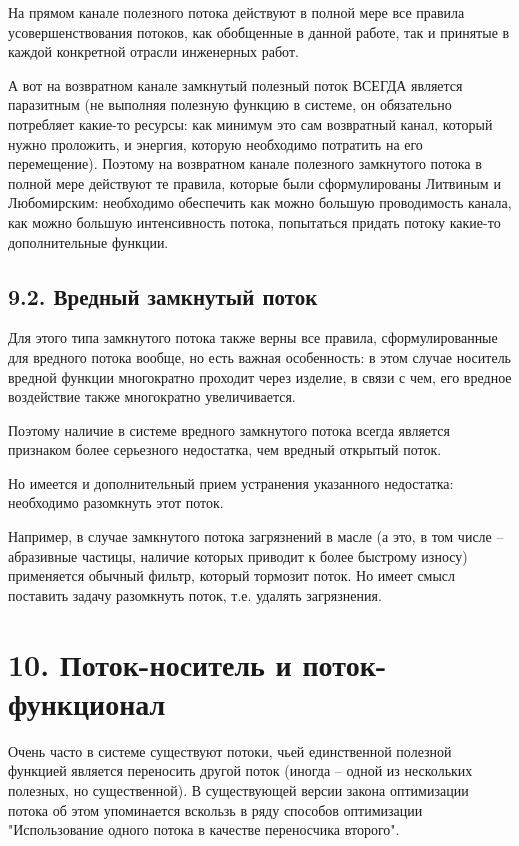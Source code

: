 \documentclass[a4paper,11pt]{article}
\begin{document}
На прямом канале полезного потока действуют в полной мере все правила
усовершенствования потоков, как обобщенные в данной работе, так и принятые в
каждой конкретной отрасли инженерных работ.

А вот на возвратном канале замкнутый полезный поток ВСЕГДА является паразитным
(не выполняя полезную функцию в системе, он обязательно потребляет какие-то
ресурсы: как минимум это сам возвратный канал, который нужно проложить, и
энергия, которую необходимо потратить на его перемещение). Поэтому на
возвратном канале полезного замкнутого потока в полной мере действуют те
правила, которые были сформулированы Литвиным и Любомирским: необходимо
обеспечить как можно большую проводимость канала, как можно большую
интенсивность потока, попытаться придать потоку какие-то дополнительные
функции.

\subsection{9.2.  Вредный замкнутый поток}

Для этого типа замкнутого потока также верны все правила, сформулированные для
вредного потока вообще, но есть важная особенность: в этом случае носитель
вредной функции многократно проходит через изделие, в связи с чем, его вредное
воздействие также многократно увеличивается.

Поэтому наличие в системе вредного замкнутого потока всегда является признаком
более серьезного недостатка, чем вредный открытый поток.

Но имеется и дополнительный прием устранения указанного недостатка: необходимо
разомкнуть этот поток.

Например, в случае замкнутого потока загрязнений в масле (а это, в том числе
-- абразивные частицы, наличие которых приводит к более быстрому износу)
применяется обычный фильтр, который тормозит поток. Но имеет смысл поставить
задачу разомкнуть поток, т.е. удалять загрязнения.

\section{10. Поток-носитель и поток-функционал}

Очень часто в системе существуют потоки, чьей единственной полезной функцией
является переносить другой поток (иногда -- одной из нескольких полезных, но
существенной). В существующей версии закона оптимизации потока об этом
упоминается вскользь в ряду способов оптимизации "Использование одного потока
в качестве переносчика второго".
\end{document}
